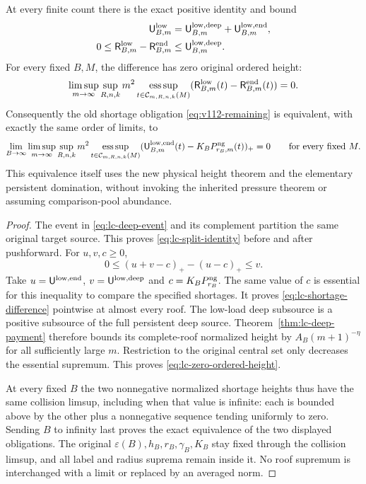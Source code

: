\begin{theorem}
\label{thm:lc-same-pool}
At every finite count there is the exact positive identity and bound
\begin{align}
 \mathsf U_{B,m}^{\rm low}
    &=\mathsf U_{B,m}^{\rm low,deep}
                             +\mathsf U_{B,m}^{\rm low,end},
                                                 \label{eq:lc-split-identity}\\
 0\le\mathsf R_{B,m}^{\rm low}-\mathsf R_{B,m}^{\rm end}
    &\le\mathsf U_{B,m}^{\rm low,deep}.
                                                 \label{eq:lc-shortage-difference}
\end{align}
For every fixed $B,M$, the difference has zero original ordered
height:
\begin{equation}\label{eq:lc-zero-ordered-height}
 \limsup_{m\to\infty}\sup_{R,n,k}m^2
 \operatorname*{ess\,sup}_{t\in\mathcal C_{m,R,n,k}(M)}
 (\mathsf R_{B,m}^{\rm low}(t)-\mathsf R_{B,m}^{\rm end}(t))=0.
\end{equation}
Consequently the old shortage obligation \eqref{eq:v112-remaining}
is equivalent, with exactly the same order of limits, to
\begin{equation}\label{eq:lc-final-shortage}
 \lim_{B\to\infty}\limsup_{m\to\infty}\sup_{R,n,k}m^2
 \operatorname*{ess\,sup}_{t\in\mathcal C_{m,R,n,k}(M)}
 (\mathsf U_{B,m}^{\rm low,end}(t)-K_BP_{r_B,m}^{\rm ng}(t))_+=0
 \qquad\hbox{for every fixed }M.
\end{equation}
This equivalence itself uses the new physical height theorem and
the elementary persistent domination, without invoking the inherited
pressure theorem or assuming comparison-pool abundance.
\end{theorem}
\begin{proof}
The event in \eqref{eq:lc-deep-event} and its complement partition
the same original target source.  This proves
\eqref{eq:lc-split-identity} before and after pushforward.  For
$u,v,c\ge0$,
\[
                  0\le(u+v-c)_+-(u-c)_+\le v.
\]
Take $u=\mathsf U^{\rm low,end}$,
$v=\mathsf U^{\rm low,deep}$ and
$c=K_BP_{r_B}^{\rm ng}$.  The same value of $c$ is essential for
this inequality to compare the specified shortages.  It proves
\eqref{eq:lc-shortage-difference} pointwise at almost every roof.
The low-load deep subsource is a positive subsource of the full
persistent deep source.  Theorem~\ref{thm:lc-deep-payment} therefore
bounds its complete-roof normalized height by
$A_B(m+1)^{-\eta}$ for all sufficiently large $m$.  Restriction
to the original central set only decreases the essential supremum.
This proves \eqref{eq:lc-zero-ordered-height}.

At every fixed $B$ the two nonnegative normalized shortage heights
thus have the same collision limsup, including when that value is
infinite: each is bounded above by the other plus a nonnegative
sequence tending uniformly to zero.  Sending $B$ to infinity last
proves the exact equivalence of the two displayed obligations.
The original $\varepsilon(B),h_B,r_B,\gamma_B,K_B$ stay fixed
through the collision limsup, and all label and radius suprema
remain inside it.  No roof supremum is interchanged with a
limit or replaced by an averaged norm.
\end{proof}

